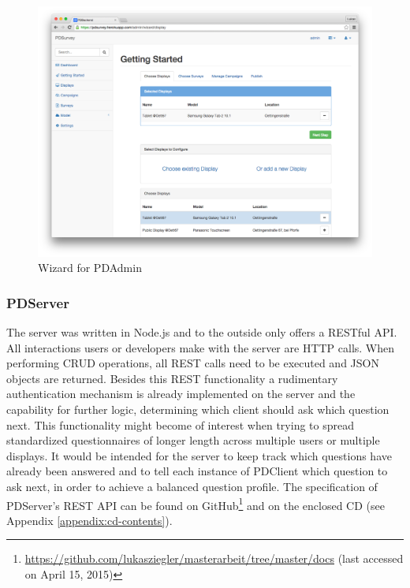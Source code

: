 	\begin{figure}%
	    \begin{center}
	        \includegraphics[width=.8\columnwidth]{img/screenshots/pdadmin/wizard-display_selected.png}
	    \end{center}
	 \caption[PDAdmin Wizard]{Wizard for PDAdmin}
	 \label{fig:pdadmin-wizard}
	\end{figure}




	\subsubsection{PDServer}

		The server was written in Node.js and to the outside only offers a RESTful API. All interactions users or developers make with the server are HTTP calls. When performing CRUD operations, all REST calls need to be executed and JSON objects are returned.
		Besides this REST functionality a rudimentary authentication mechanism is already implemented on the server and the capability for further logic, determining which client should ask which question next. This functionality might become of interest when trying to spread standardized questionnaires of longer length across multiple users or multiple displays. It would be intended for the server to keep track which questions have already been answered and to tell each instance of PDClient which question to ask next, in order to achieve a balanced question profile.
		The specification of PDServer's REST API can be found on GitHub\footnote{\url{https://github.com/lukasziegler/masterarbeit/tree/master/docs} (last accessed on April 15, 2015)} and on the enclosed CD (see Appendix \ref{appendix:cd-contents}).



